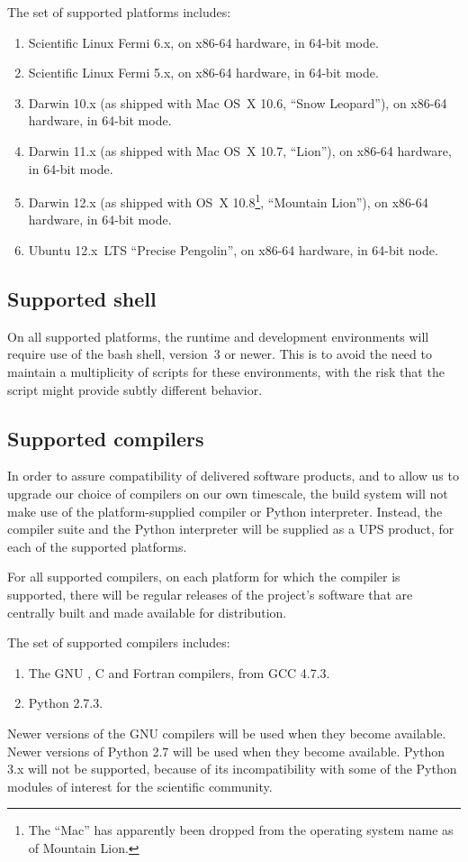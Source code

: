 \documentclass[draftmode,draftwater]{memarticle}
\begin{document}
The set of supported platforms includes:
\begin{enumerate}
\item Scientific Linux Fermi 6.x, on x86-64 hardware, in 64-bit mode.
\item Scientific Linux Fermi 5.x, on x86-64 hardware, in 64-bit mode.
\item Darwin 10.x (as shipped with Mac OS~X 10.6, ``Snow Leopard''), on
  x86-64 hardware, in 64-bit mode.
\item Darwin 11.x (as shipped with Mac OS~X 10.7, ``Lion''), on x86-64
  hardware, in 64-bit mode.
\item Darwin 12.x (as shipped with OS~X 10.8\footnote{The ``Mac'' has
    apparently been dropped from the operating system name as of
    Mountain Lion.}, ``Mountain Lion''), on x86-64 hardware, in 64-bit
  mode.
\item Ubuntu 12.x~LTS ``Precise Pengolin'', on x86-64 hardware, in
  64-bit node.
\end{enumerate}

\subsection{Supported shell}

On all supported platforms, the runtime and development environments
will require use of the bash shell, version~3 or newer. This is to avoid
the need to maintain a multiplicity of scripts for these environments,
with the risk that the script might provide subtly different behavior.

\subsection{Supported compilers}

In order to assure compatibility of delivered software products, and to
allow us to upgrade our choice of compilers on our own timescale, the
build system will not make use of the platform-supplied compiler or
Python interpreter. Instead, the compiler suite and the Python
interpreter will be supplied as a UPS product, for each of the supported
platforms.

For all supported compilers, on each platform for which the compiler is
supported, there will be regular releases of the project's software that
are centrally built and made available for distribution.

The set of supported compilers includes:
\begin{enumerate}
\item The GNU \cpp{}, C and Fortran compilers, from GCC 4.7.3.
\item Python 2.7.3.
\end{enumerate}
Newer versions of the GNU compilers will be used when they become
available. Newer versions of Python 2.7 will be used when they become
available. Python 3.x will not be supported, because of its
incompatibility with some of the Python modules of interest for the
scientific community.
\end{document}
